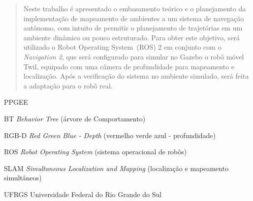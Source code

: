 \documentclass[repeatfields,xlists,xpacks,oneside,yearsonly]{ufrgscca}
\begin{document}
\maketitle




\begin{abstract}

    Neste trabalho é apresentado o embasamento teórico e o
    planejamento da implementação de mapeamento de ambientes a um
    sistema de navegação autônomo, com intuito de permitir
    o planejamento de trajetórias em um ambiente dinâmico ou
    pouco estruturado.
    Para obter este objetivo, será utilizado o Robot Operating System~(ROS) 2
    em conjunto com o \textit{Navigation 2}, que será configurado para
    simular no Gazebo o robô móvel Twil, equipado com uma câmera
    de profundidade para mapeamento e localização.
    Após a verificação do sistema no ambiente simulado, será feita a
    adaptação para o robô real.
\end{abstract}



\setcounter{tocdepth}{3}

\listoffigures

\listoftables

\begin{listofabbrv}{PPGEE}
    \item[BT] \textit{Behavior Tree} (árvore de Comportamento)
    \item[RGB-D] \textit{Red Green Blue - Depth} (vermelho verde azul - profundidade)
    \item[ROS] \textit{Robot Operating System} (sistema operacional de robôs)
    \item[SLAM] \textit{Simultaneous Localization and Mapping} (localização e mapeamento simultâneos)
    \item[UFRGS] Universidade Federal do Rio Grande do Sul
\end{listofabbrv}
\end{document}
